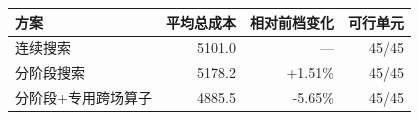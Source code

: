 \begin{tabular*}{0.84\linewidth}{@{\extracolsep{\fill}}lrrr@{}}
\toprule
方案 & 平均总成本 & 相对前档变化 & 可行单元 \\
\midrule
连续搜索 & 5101.0 & --- & 45/45 \\
分阶段搜索 & 5178.2 & +1.51\% & 45/45 \\
分阶段+专用跨场算子 & 4885.5 & -5.65\% & 45/45 \\
\bottomrule
\end{tabular*}
